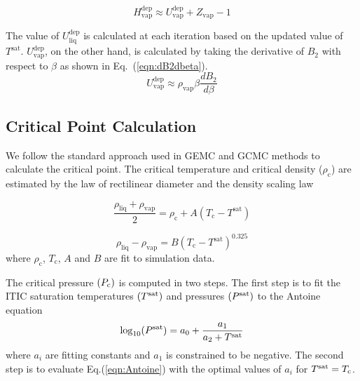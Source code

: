 \documentclass[5p,times]{elsarticle}
\begin{document}
\begin{equation}
H^{\mathrm{dep}}_\mathrm{vap} \approx U^{\mathrm{dep}}_\mathrm{vap}+Z_\mathrm{vap} - 1
\label{eqn:HsatVap}
\end{equation}

The value of $U^{\mathrm{dep}}_\mathrm{liq}$ is calculated at each iteration based on the updated value of $T^{\mathrm{sat}}$. $U^{\mathrm{dep}}_\mathrm{vap}$, on the other hand, is calculated by taking the derivative of $B_2$ with respect to $\beta$ as shown in Eq.~(\ref{eqn:dB2dbeta}).
\begin{equation}
U^{\mathrm{dep}}_\mathrm{vap}\approx \rho_{\mathrm{vap}} \beta \frac{dB_2}{d\beta}
\label{eqn:dB2dbeta}
\end{equation}

\subsection{Critical Point Calculation}\label{sec:PcCalc}
We follow the standard approach used in GEMC and GCMC methods to calculate the critical point. The critical temperature and critical density ($\rho_\mathrm{c}$) are estimated by the law of rectilinear diameter \cite{Rowlinson1982} and the density scaling law \cite{Rowlinson2013}

\begin{equation}
\frac{\rho_{\mathrm{liq}} +\rho_{\mathrm{vap}}}{2}=\rho_\mathrm{c}+A(T_\mathrm{c}-T^{\mathrm{sat}})
\label{eqn:rectilinearLaw}
\end{equation}

\begin{equation}
\rho_{\mathrm{liq}} -\rho_{\mathrm{vap}}=B(T_\mathrm{c}-T^{\mathrm{sat}})^{0.325}
\label{eqn:scalingLaw}
\end{equation}
where $\rho_\mathrm{c}$, $ T_\mathrm{c}$, $A$ and $B$ are fit to simulation data.

The critical pressure $(P_{\rm c})$ is computed in two steps. The first step is to fit the ITIC saturation temperatures $(T^{\rm sat})$ and pressures $(P^{\rm sat})$ to the Antoine equation \cite{rowlinson2013liquids}
\begin{equation} \label{eqn:Antoine}
\log_{10}(P^{\rm sat}) = a_0 + \frac{a_1}{a_2 + T^{\rm sat}}
\end{equation} 
where $a_i$ are fitting constants and $a_1$ is constrained to be negative. The second step is to evaluate Eq.(\ref{eqn:Antoine}) with the optimal values of $a_i$ for $T^{\rm sat} = T_{\rm c}$. 
\end{document}
